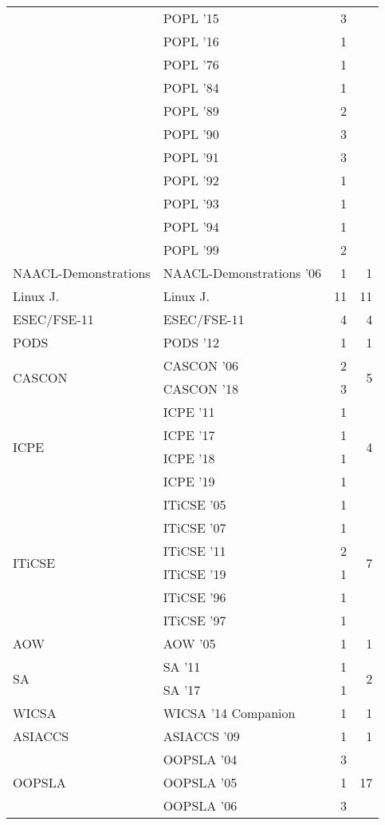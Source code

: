 \begin{table*}[t]
\begin{tabular}{llrr}
& POPL '15 & 3 &\\
& POPL '16 & 1 &\\
& POPL '76 & 1 &\\
& POPL '84 & 1 &\\
& POPL '89 & 2 &\\
& POPL '90 & 3 &\\
& POPL '91 & 3 &\\
& POPL '92 & 1 &\\
& POPL '93 & 1 &\\
& POPL '94 & 1 &\\
& POPL '99 & 2 &\\
\multirow{1}{*}{NAACL-Demonstrations } & NAACL-Demonstrations '06 & 1 & \multirow{1}{*}{1}\\
\multirow{1}{*}{Linux J.} & Linux J. & 11 & \multirow{1}{*}{11}\\
\multirow{1}{*}{ESEC/FSE-11} & ESEC/FSE-11 & 4 & \multirow{1}{*}{4}\\
\multirow{1}{*}{PODS } & PODS '12 & 1 & \multirow{1}{*}{1}\\
\multirow{2}{*}{CASCON } & CASCON '06 & 2 & \multirow{2}{*}{5}\\
& CASCON '18 & 3 &\\
\multirow{4}{*}{ICPE } & ICPE '11 & 1 & \multirow{4}{*}{4}\\
& ICPE '17 & 1 &\\
& ICPE '18 & 1 &\\
& ICPE '19 & 1 &\\
\multirow{6}{*}{ITiCSE } & ITiCSE '05 & 1 & \multirow{6}{*}{7}\\
& ITiCSE '07 & 1 &\\
& ITiCSE '11 & 2 &\\
& ITiCSE '19 & 1 &\\
& ITiCSE '96 & 1 &\\
& ITiCSE '97 & 1 &\\
\multirow{1}{*}{AOW } & AOW '05 & 1 & \multirow{1}{*}{1}\\
\multirow{2}{*}{SA } & SA '11 & 1 & \multirow{2}{*}{2}\\
& SA '17 & 1 &\\
\multirow{1}{*}{WICSA } & WICSA '14 Companion & 1 & \multirow{1}{*}{1}\\
\multirow{1}{*}{ASIACCS } & ASIACCS '09 & 1 & \multirow{1}{*}{1}\\
\multirow{11}{*}{OOPSLA } & OOPSLA '04 & 3 & \multirow{11}{*}{17}\\
& OOPSLA '05 & 1 &\\
& OOPSLA '06 & 3 &\\

\end{tabular}
\end{table*}
